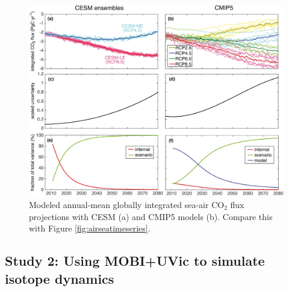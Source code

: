 \documentclass[a4paper]{article}
\begin{document}
\begin{enumerate}
\begin{figure}[H]   %
   \centering
   \includegraphics[trim=0 760 0 0,clip,scale=0.3]{Lovenduski16_GBC_Fig2.jpg}
   \caption[]{Modeled annual-mean globally integrated sea-air $\mathrm{CO_2}$ flux projections \citep{Lovenduski16} with CESM (a) and CMIP5 models (b). Compare this with Figure \ref{fig:airseatimeseries}.}
   \label{fig:airseatimeseries_cmip5}
\end{figure}

\end{enumerate}

\subsection{Study 2: Using MOBI+UVic to simulate isotope dynamics}
\end{document}
